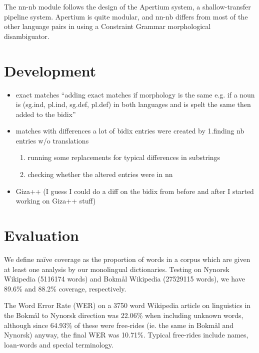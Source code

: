 \documentclass[11pt]{article}
\begin{document}
The nn-nb module follows the design of the Apertium
system\citep{corbi05oss}, a shallow-transfer pipeline system. Apertium is
quite modular, and nn-nb differs from most of the other language pairs
in using a Constraint Grammar morphological disambiguator.
\section{Development}
\label{sec-3}

\begin{itemize}
\item exact matches ``adding exact matches if morphology is the same
  e.g. if a noun is (sg.ind, pl.ind, sg.def, pl.def) in both
  languages and is spelt the same then added to the bidix''
\item matches with differences a lot of bidix entries were created by
  1.finding nb entries w/o translations

\begin{enumerate}
\item running some replacements for typical differences in substrings
\item checking whether the altered entries were in nn
\end{enumerate}

\item Giza++ (I guess I could do a diff on the bidix from before and after
  I started working on Giza++ stuff)
\end{itemize}
\section{Evaluation}
\label{sec-4}

We define naïve coverage as the proportion of words in a corpus which
are given at least one analysis by our monolingual
dictionaries. Testing on Nynorsk Wikipedia (5116174 words) and Bokmål
Wikipedia (27529115 words), we have 89.6\% and 88.2\% coverage,
respectively.

The Word Error Rate (WER) on a 3750 word Wikipedia article on
linguistics in the Bokmål to Nynorsk direction was 22.06\% when
including unknown words, although since 64.93\% of these were
free-rides (ie. the same in Bokmål and Nynorsk) anyway, the final WER
was 10.71\%. Typical free-rides include names, loan-words and special
terminology.
\end{document}
